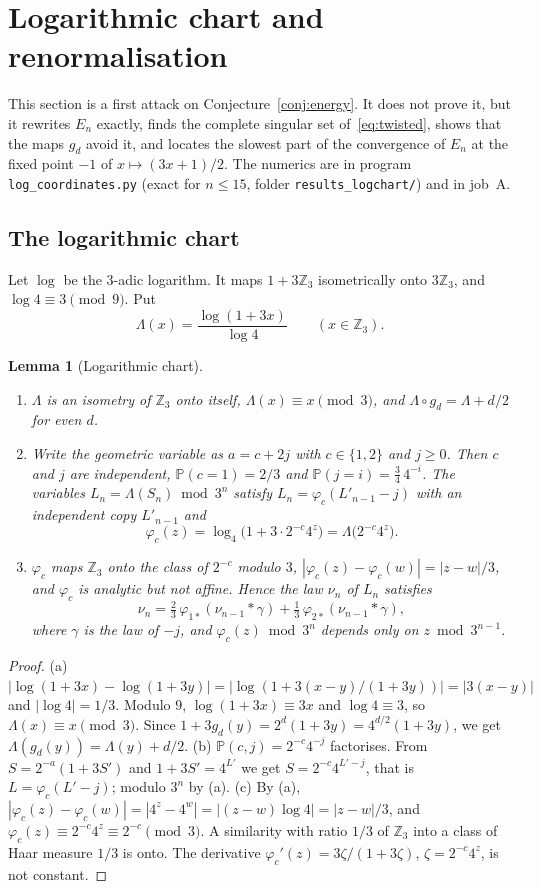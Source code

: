 \documentclass[11pt]{article}
\newtheorem{lemma}[theorem]{Lemma}
\theoremstyle{remark}
\newcommand{\Z}{\mathbb Z}
\newcommand{\Prob}{\mathbb P}
\begin{document}
\section{Logarithmic chart and renormalisation}\label{sec:logchart}
This section is a first attack on Conjecture~\ref{conj:energy}. It does not prove it, but it rewrites $E_n$ exactly, finds the complete singular set of~\eqref{eq:twisted}, shows that the maps $g_d$ avoid it, and locates the slowest part of the convergence of $E_n$ at the fixed point $-1$ of $x\mapsto(3x+1)/2$. The numerics are in program \texttt{log\_coordinates.py} (exact for $n\le15$, folder \texttt{results\_logchart/}) and in job~A.

\subsection*{The logarithmic chart}
Let $\log$ be the $3$-adic logarithm. It maps $1+3\Z_3$ isometrically onto $3\Z_3$, and $\log4\equiv3\pmod9$. Put
\[
 \Lambda(x)=\frac{\log(1+3x)}{\log4}\qquad(x\in\Z_3).
\]

\begin{lemma}[Logarithmic chart]\label{lem:logchart}
\leavevmode\begin{enumerate}
\item[(a)] $\Lambda$ is an isometry of $\Z_3$ onto itself, $\Lambda(x)\equiv x\pmod3$, and $\Lambda\circ g_d=\Lambda+d/2$ for even $d$.
\item[(b)] Write the geometric variable as $a=c+2j$ with $c\in\{1,2\}$ and $j\ge0$. Then $c$ and $j$ are independent, $\Prob(c=1)=2/3$ and $\Prob(j=i)=\frac34\,4^{-i}$. The variables $L_n=\Lambda(S_n)\bmod3^n$ satisfy $L_n=\varphi_c(L'_{n-1}-j)$ with an independent copy $L'_{n-1}$ and
\[
 \varphi_c(z)=\log_4\bigl(1+3\cdot2^{-c}4^z\bigr)=\Lambda\bigl(2^{-c}4^z\bigr).
\]
\item[(c)] $\varphi_c$ maps $\Z_3$ onto the class of $2^{-c}$ modulo $3$, $|\varphi_c(z)-\varphi_c(w)|=|z-w|/3$, and $\varphi_c$ is analytic but not affine. Hence the law $\nu_n$ of $L_n$ satisfies
\[
 \nu_n=\tfrac23\,\varphi_{1*}(\nu_{n-1}*\gamma)+\tfrac13\,\varphi_{2*}(\nu_{n-1}*\gamma),
\]
where $\gamma$ is the law of $-j$, and $\varphi_c(z)\bmod3^n$ depends only on $z\bmod3^{n-1}$.
\end{enumerate}
\end{lemma}

\begin{proof}
(a) $|\log(1+3x)-\log(1+3y)|=|\log(1+3(x-y)/(1+3y))|=|3(x-y)|$ and $|\log4|=1/3$. Modulo $9$, $\log(1+3x)\equiv3x$ and $\log4\equiv3$, so $\Lambda(x)\equiv x\pmod3$. Since $1+3g_d(y)=2^d(1+3y)=4^{d/2}(1+3y)$, we get $\Lambda(g_d(y))=\Lambda(y)+d/2$. (b) $\Prob(c,j)=2^{-c}4^{-j}$ factorises. From $S=2^{-a}(1+3S')$ and $1+3S'=4^{L'}$ we get $S=2^{-c}4^{L'-j}$, that is $L=\varphi_c(L'-j)$; modulo $3^n$ by (a). (c) By (a), $|\varphi_c(z)-\varphi_c(w)|=|4^z-4^w|=|(z-w)\log4|=|z-w|/3$, and $\varphi_c(z)\equiv2^{-c}4^z\equiv2^{-c}\pmod3$. A similarity with ratio $1/3$ of $\Z_3$ into a class of Haar measure $1/3$ is onto. The derivative $\varphi_c'(z)=3\zeta/(1+3\zeta)$, $\zeta=2^{-c}4^z$, is not constant.
\end{proof}
\end{document}
